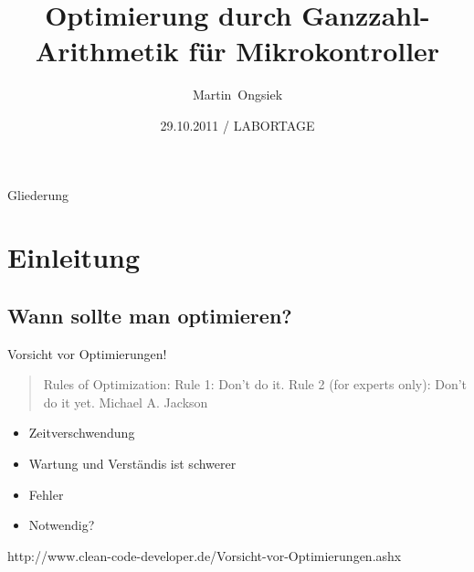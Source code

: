 \documentclass{beamer}
\title[] %
{Optimierung durch Ganzzahl-Arithmetik für Mikrokontroller}
\author[] %
{Martin~Ongsiek}
\date[labortage] %
{29.10.2011 / LABORTAGE}
\begin{document}
\begin{frame}
  \titlepage
\end{frame}

\begin{frame}{Gliederung}
  \tableofcontents
\end{frame}



\section{Einleitung}

\subsection{Wann sollte man optimieren?}

\begin{frame}{Vorsicht vor Optimierungen!}
\begin{quote}
Rules of Optimization: \newline
Rule 1: Don't do it.\newline
Rule 2 (for experts only): Don't do it yet. \newline
Michael A. Jackson
\end{quote}

\pause
  \begin{itemize}
  \item Zeitverschwendung \pause
  \item Wartung und Verständis ist schwerer \pause
  \item Fehler \pause
  \item Notwendig?
  \end{itemize}
\small{http://www.clean-code-developer.de/Vorsicht-vor-Optimierungen.ashx}
\end{frame}
\end{document}
